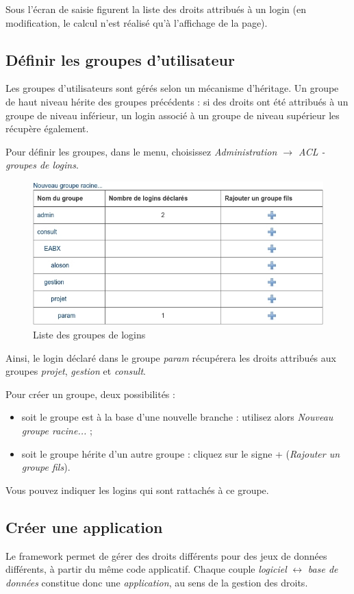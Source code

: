 Sous l'écran de saisie figurent la liste des droits attribués à un login (en modification, le calcul n'est réalisé qu'à l'affichage de la page).

\subsection{Définir les groupes d'utilisateur}

Les groupes d'utilisateurs sont gérés selon un mécanisme d'héritage. Un groupe de haut niveau hérite des groupes précédents : si des droits ont été attribués à un groupe de niveau inférieur, un login associé à un groupe de niveau supérieur les récupère également.

Pour définir les groupes, dans le menu, choisissez \textit{Administration $\rightarrow$ ACL - groupes de logins}.

\begin{figure}[H]
\includegraphics[width=\linewidth]{dessin/acl_groupe}
\caption{Liste des groupes de logins}
\end{figure}

Ainsi, le login déclaré dans le groupe \textit{param} récupérera les droits attribués aux groupes \textit{projet}, \textit{gestion} et \textit{consult}.

Pour créer un groupe, deux possibilités :
\begin{itemize}
\item soit le groupe est à la base d'une nouvelle branche : utilisez alors \textit{Nouveau groupe racine...} ;
\item soit le groupe hérite d'un autre groupe : cliquez sur le signe + (\textit{Rajouter un groupe fils}).
\end{itemize}

Vous pouvez indiquer les logins qui sont rattachés à ce groupe.


\subsection{Créer une application}
Le framework permet de gérer des droits différents pour des jeux de données différents, à partir du même code applicatif. Chaque couple \textit{logiciel} $\leftrightarrow$ \textit{base de données} constitue donc une \textit{application}, au sens de la gestion des droits.

